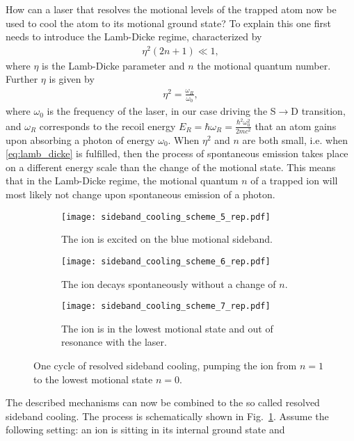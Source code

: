 How can a laser that resolves the motional levels of the trapped atom now be
used to cool the atom to its motional ground state? To explain this one first
needs to introduce the Lamb-Dicke regime, characterized by
\begin{align}
  \label{eq:lamb_dicke}
  \eta ^{2}(2n+1)\ll 1,
\end{align}
where $\eta$ is the Lamb-Dicke parameter and $n$ the motional quantum number.
Further $\eta$ is given by
\begin{align}
  \label{eq:def_eta}
  \eta^2 = \frac{\omega_R}{\omega_0},
\end{align}
where $\omega_0$ is the frequency of the laser, in our case driving the
S$\rightarrow$D transition, and $\omega_R$ corresponds to the recoil energy $E_R
= \hbar \omega_R = \frac{\hbar^2\omega_0^2}{2mc^2}$ that an atom gains upon
absorbing a photon of energy $\omega_0$. When $\eta^2$ and $n$ are both small,
i.e. when \eqref{eq:lamb_dicke} is fulfilled, then the process of
spontaneous emission takes place on a different energy scale than the change of
the motional state. This means that in the Lamb-Dicke regime, the motional
quantum $n$ of a trapped ion will most likely not change upon spontaneous
emission of a photon.
\begin{figure}[t]
  \centering
  \begin{subfigure}[t]{0.33\linewidth}
    \centering
    \texttt{[image: sideband\_cooling\_scheme\_5\_rep.pdf]}
    \caption{The ion is excited on the blue motional sideband.}
  \end{subfigure}
  \begin{subfigure}[t]{0.3\linewidth}
    \centering
    \texttt{[image: sideband\_cooling\_scheme\_6\_rep.pdf]}
    \caption{The ion decays spontaneously without a change of $n$.}
  \end{subfigure}
  \begin{subfigure}[t]{0.3\linewidth}
    \centering
    \texttt{[image: sideband\_cooling\_scheme\_7\_rep.pdf]}
    \caption{The ion is in the lowest motional state and out of resonance with
    the laser.}
  \end{subfigure}
  \caption{One cycle of resolved sideband cooling, pumping the ion from $n=1$ to
  the lowest motional state $n=0$.}
  \label{fig:sideband_cooling}
\end{figure}
The described mechanisms can now be combined to the so called resolved sideband
cooling. The process is schematically shown in Fig.~\ref{fig:sideband_cooling}.
Assume the following setting: an ion is sitting in its internal ground state and
